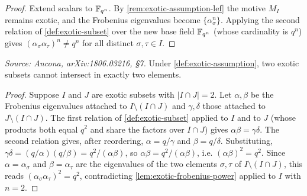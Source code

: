 \begin{proof}
  Extend scalars to \(\mathbb{F}_{q^n}\). By \cref{rem:exotic-assumption-lef} the motive
  \(M_I\) remains exotic, and the Frobenius eigenvalues become
  \(\{\alpha_\sigma^n\}\). Applying the second relation of
  \cref{def:exotic-subset} over the new base field \(\mathbb{F}_{q^n}\) (whose cardinality
  is \(q^n\)) gives \((\alpha_\sigma \alpha_\tau)^n \neq q^n\) for all distinct
  \(\sigma, \tau \in I\).
\end{proof}

\begin{lemma}
  \label{lem:exotic-no-two}
  \textit{Source: Ancona, arXiv:1806.03216, §7.}
  Under \cref{def:exotic-assumption}, two exotic subsets cannot intersect in
  exactly two elements.
\end{lemma}

\begin{proof}
  Suppose \(I\) and \(J\) are exotic subsets with \(|I \cap J| = 2\). Let
  \(\alpha, \beta\) be the Frobenius eigenvalues attached to \(I \setminus
  (I \cap J)\) and \(\gamma, \delta\) those attached to \(J \setminus (I \cap
  J)\). The first relation of \cref{def:exotic-subset} applied to \(I\) and to
  \(J\) (whose products both equal \(q^2\) and share the factors over
  \(I \cap J\)) gives \(\alpha\beta = \gamma\delta\). The second relation gives,
  after reordering, \(\alpha = q/\gamma\) and \(\beta = q/\delta\). Substituting,
  \(\gamma\delta = (q/\alpha)(q/\beta) = q^2/(\alpha\beta)\), so
  \(\alpha\beta = q^2/(\alpha\beta)\), i.e. \((\alpha\beta)^2 = q^2\). Since
  \(\alpha = \alpha_\sigma\) and \(\beta = \alpha_\tau\) are the eigenvalues of
  the two elements \(\sigma, \tau\) of \(I \setminus (I \cap J)\), this reads
  \((\alpha_\sigma \alpha_\tau)^2 = q^2\), contradicting
  \cref{lem:exotic-frobenius-power} applied to \(I\) with \(n = 2\).
\end{proof}

